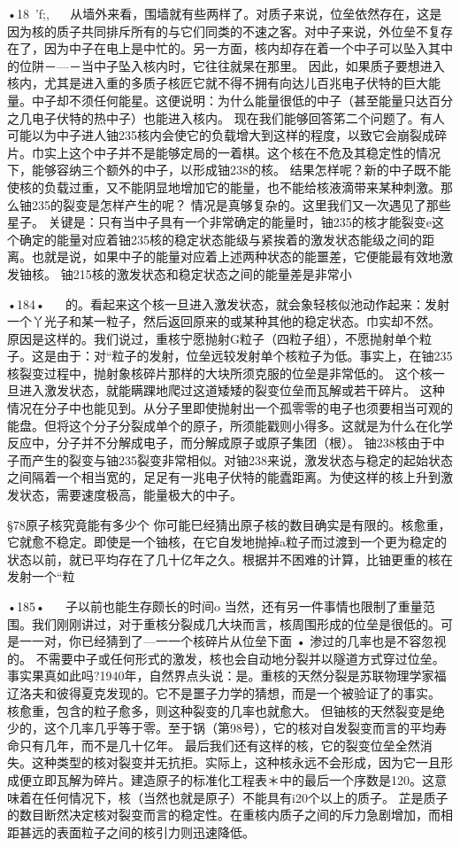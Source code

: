 •18~'f;,
  
从墙外来看，围墙就有些两样了。对质子来说，位垒依然存在，这是因为核的质子共同排斥所有的与它们同类的不速之客。对中子来说，外位垒不复存在了，因为中子在电上是中忙的。另一方面，核内却存在着一个中子可以坠入其中的位阱－—－当中子坠入核内时，它往往就杲在那里。
因此，如果质子要想进入核内，尤其是进入重的多质子核匠它就不得不拥有向达儿百兆电子伏特的巨大能量。中子却不须任何能星。这便说明：为什么能量很低的中子（甚至能量只达百分之几电子伏特的热中子）也能进入核内。
现在我们能够回答笫二个问题了。有人可能以为中子进人铀235核内会使它的负载增大到这样的程度，以致它会崩裂成碎片。巾实上这个中子并不是能够定局的一着棋。这个核在不危及其稳定性的情况下，能够容纳三个额外的中子，以形成铀238的核。
结果怎样呢？新的中子既不能使核的负载过重，又不能阴显地增加它的能量，也不能给核液滴带来某种刺激。那么铀235的裂变是怎样产生的呢？
情况是真够复杂的。这里我们又一次遇见了那些星子。
关键是：只有当中子具有一个非常确定的能量时，铀235的核才能裂变e这个确定的能量对应着铀235核的稳定状态能级与紧挨着的激发状态能级之间的距离。也就是说，如果中子的能量对应着上述两种状态的能噩差，它便能最有效地激发铀核。
铀215核的激发状态和稳定状态之间的能量差是非常小

•184•
  
的。看起来这个核一旦进入激发状态，就会象轻核似池动作起来：发射一个丫光子和某一粒子，然后返回原来的或某种其他的稳定状态。巾实却不然。
原因是这样的。我们说过，重核宁愿抛射G粒子（四粒子组），不愿抛射单个粒子。这是由于：对“粒子的发射，位垒远较发射单个核粒子为低。事实上，在铀235核裂变过程中，抛射象核碎片那样的大块所须克服的位垒是非常低的。
这个核一旦进入激发状态，就能瞒踝地爬过这道矮矮的裂变位垒而瓦解或若干碎片。
这种情况在分子中也能见到。从分子里即使抛射出一个孤零零的电子也须要相当可观的能盘。但将这个分子分裂成单个的原子，所须能戳则小得多。这就是为什么在化学反应中，分子并不分解成电子，而分解成原子或原子集团（根）。
铀238核由于中子而产生的裂变与铀235裂变非常相似。对铀238来说，激发状态与稳定的起始状态之间隔着一个相当宽的，足足有一兆电子伏特的能蠹距离。为使这样的核上升到激发状态，需要速度极高，能量极大的中子。

§78原子核究竟能有多少个
你可能巳经猜出原子核的数目确实是有限的。核愈重，它就愈不稳定。即使是一个铀核，在它自发地抛掉a粒子而过渡到一个更为稳定的状态以前，就已平均存在了几十亿年之久。根据并不困难的计算，比铀更重的核在发射一个“粒

•185•
  
子以前也能生存颇长的时间o
当然，还有另一件事情也限制了重量范围。我们刚刚讲过，对于重核分裂成几大块而言，核周围形成的位垒是很低的。可是一一对，你已经猜到了—一一个核碎片从位垒下面
•	渗过的几率也是不容忽视的。
不需要中子或任何形式的激发，核也会自动地分裂并以隧道方式穿过位垒。事实果真如此吗?1940年，自然界点头说：是。重核的天然分裂是苏联物理学家福辽洛夫和彼得夏克发现的。它不是噩子力学的猜想，而是一个被验证了的事实。
核愈重，包含的粒子愈多，则这种裂变的几率也就愈大。
但铀核的天然裂变是绝少的，这个几率几乎等于零。至于锅（第98号），它的核对自发裂变而言的平均寿命只有几年，而不是几十亿年。
最后我们还有这样的核，它的裂变位垒全然消失。这种类型的核对裂变并无抗拒。实际上，这种核永远不会形成，因为它一且形成便立即瓦解为碎片。建造原子的标准化工程表＊中的最后一个序数是120。这意味着在任何情况下，核（当然也就是原子）不能具有i20个以上的质子。
芷是质子的数目断然决定核对裂变而言的稳定性。在重核内质子之间的斥力急剧增加，而相距甚远的表面粒子之间的核引力则迅速降低。

